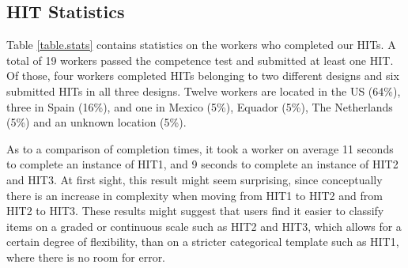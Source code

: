 \documentclass[11pt,letterpaper]{article}
\begin{document}
\subsection{HIT Statistics}

Table \ref{table.stats} contains statistics on the workers who completed our HITs. A total of 19 workers passed the competence test and submitted at least one HIT. Of those, four workers completed HITs belonging to two different designs and six submitted HITs in all three designs. Twelve workers are located in the US (64\%), three in Spain (16\%), and one in Mexico (5\%), Equador (5\%), The Netherlands (5\%) and an unknown location (5\%).

As to a comparison of completion times, it took a worker on average 11 seconds to complete an instance of HIT1, and 9 seconds to complete an instance of HIT2 and HIT3. At first sight, this result might seem surprising, since conceptually there is an increase in complexity when moving from HIT1 to HIT2 and from HIT2 to HIT3. These results might suggest that users find it easier to classify items on a graded or continuous scale such as HIT2 and HIT3, which allows for a certain degree of flexibility, than on a stricter categorical template such as HIT1, where there is no room for error.
\end{document}
